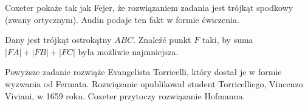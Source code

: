 Coxeter \cite[s. 36, 37]{coxeter_1967} pokaże tak jak Fejer, że rozwiązaniem zadania jest trójkąt spodkowy (zwany ortycznym).
Audin \cite[s. 101]{audin_2003} podaje ten fakt w formie ćwiczenia. %

\begin{problem}
	\label{punkt_fermata}
	Dany jest trójkąt ostrokątny $ABC$.
	Znaleźć punkt $F$ taki, by suma $|FA| + |FB| + |FC|$ była możliwie najmniejsza.
%
\end{problem}


Powyższe zadanie rozwiąże Evangelista Torricelli, który dostał je w formie wyzwania od Fermata.
%
Rozwiązanie opublikował student Torricelliego, Vincenzo Viviani, w 1659 roku.
Coxeter \cite[s. 37]{coxeter_1967} przytoczy rozwiązanie Hofmanna. %

%